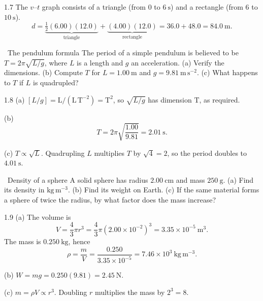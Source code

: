 \begin{tabletworkspace}[6cm]
\end{tabletworkspace}

\begin{solution}{1.7}
The $v$--$t$ graph consists of a triangle (from $0$ to $6\ \mathrm{s}$) and a
rectangle (from $6$ to $10\ \mathrm{s}$).
\[
d=\underbrace{\tfrac12(6.00)(12.0)}_{\text{triangle}}
+\underbrace{(4.00)(12.0)}_{\text{rectangle}}
=36.0+48.0=84.0\ \mathrm{m}.
\]
\end{solution}

\begin{exercise}{\core\ The pendulum formula}
The period of a simple pendulum is believed to be
$T=2\pi\sqrt{L/g}$, where $L$ is a length and $g$ an acceleration.
(a) Verify the dimensions. (b) Compute $T$ for $L=1.00\ \mathrm{m}$ and
$g=9.81\ \mathrm{m\,s^{-2}}$. (c) What happens to $T$ if $L$ is quadrupled?
\end{exercise}

\begin{tabletworkspace}[6cm]
\end{tabletworkspace}

\begin{solution}{1.8}
(a) $[L/g]=\mathrm{L}/(\mathrm{L\,T^{-2}})=\mathrm{T^2}$, so
$\sqrt{L/g}$ has dimension $\mathrm{T}$, as required.

(b)
\[
T=2\pi\sqrt{\frac{1.00}{9.81}}=2.01\ \mathrm{s}.
\]

(c) $T\propto\sqrt L$. Quadrupling $L$ multiplies $T$ by $\sqrt4=2$, so the
period doubles to $4.01\ \mathrm{s}$.
\end{solution}

\begin{exercise}{\mastery\ Density of a sphere}
A solid sphere has radius $2.00\ \mathrm{cm}$ and mass $250\ \mathrm{g}$.
(a) Find its density in $\mathrm{kg\,m^{-3}}$. (b) Find its weight on Earth.
(c) If the same material forms a sphere of twice the radius, by what factor does
the mass increase?
\end{exercise}

\begin{tabletworkspace}[6cm]
\end{tabletworkspace}

\begin{solution}{1.9}
(a) The volume is
\[
V=\frac43\pi r^3=\frac43\pi(2.00\times10^{-2})^3
=3.35\times10^{-5}\ \mathrm{m^3}.
\]
The mass is $0.250\ \mathrm{kg}$, hence
\[
\rho=\frac{m}{V}=\frac{0.250}{3.35\times10^{-5}}
=7.46\times10^{3}\ \mathrm{kg\,m^{-3}}.
\]

(b) $W=mg=0.250(9.81)=2.45\ \mathrm{N}$.

(c) $m=\rho V\propto r^3$. Doubling $r$ multiplies the mass by $2^3=8$.
\end{solution}

